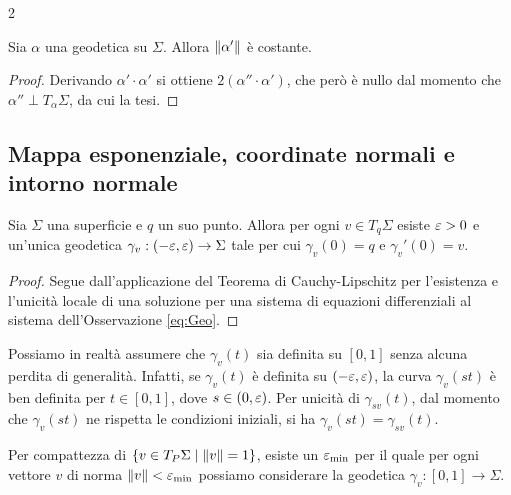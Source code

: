 \begin{multicols*}{2}
    \begin{proposition}
        Sia $\alpha$ una geodetica su $\Sigma$. Allora
        $\left\lVert \alpha' \right\rVert$ è costante.
    \end{proposition}

    \begin{proof}
        Derivando $\alpha' \cdot \alpha'$ si ottiene
        $2 (\alpha'' \cdot \alpha')$, che però è nullo dal momento
        che $\alpha'' \perp T_{\alpha} \Sigma$, da cui la tesi.
    \end{proof}

    \subsection{Mappa esponenziale, coordinate normali e intorno normale}

    \begin{proposition}
        Sia $\Sigma$ una superficie e $q$ un suo punto. Allora per ogni $v \in T_q \Sigma$ esiste $\varepsilon > 0$ e
        un'unica geodetica $\gamma_v : (-\varepsilon, \varepsilon) \to \Sigma$ tale per cui $\gamma_v(0) = q$ e
        $\gamma_v'(0) = v$.
    \end{proposition}

    \begin{proof}
        Segue dall'applicazione del Teorema di Cauchy-Lipschitz per l'esistenza e l'unicità locale di una
        soluzione per una sistema di equazioni differenziali al sistema dell'Osservazione \ref{eq:Geo}.
    \end{proof}

    \begin{remark}
        Possiamo in realtà assumere che $\gamma_v(t)$ sia definita su $[0, 1]$ senza alcuna perdita di generalità.
        Infatti, se $\gamma_v(t)$ è definita su $(-\varepsilon, \varepsilon)$, la curva
        $\gamma_v(st)$ è ben definita per $t \in [0, 1]$, dove $s \in (0, \varepsilon)$. Per unicità di $\gamma_{sv}(t)$, dal momento che
        $\gamma_v(st)$ ne rispetta le condizioni iniziali, si ha $\gamma_v(st) = \gamma_{sv}(t)$. \smallskip
    \end{remark}

    \begin{remark} \label{rmk:geodetiche}
        Per compattezza di $\{v \in T_P \Sigma \mid \left\lVert v \right\rVert = 1\}$, esiste un $\varepsilon_{\textnormal{min}}$ per il
        quale per ogni vettore $v$ di norma $\left\lVert v \right\rVert < \varepsilon_{\textnormal{min}}$ possiamo considerare la geodetica
        $\gamma_v : [0, 1] \to \Sigma$. \smallskip


\end{remark}
\end{multicols*}

